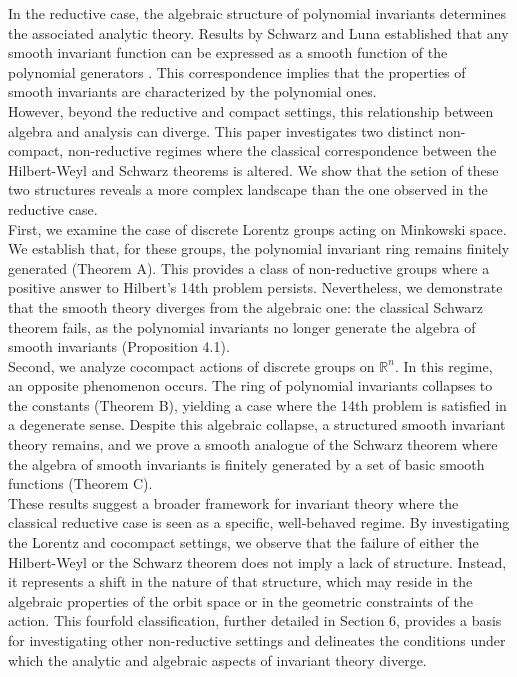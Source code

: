 \documentclass[]{article}
\begin{document}
In the reductive case, the algebraic structure of polynomial invariants determines the associated analytic theory. Results by Schwarz and Luna established that any smooth invariant function can be expressed as a smooth function of the polynomial generators \cite{luna1976, schwarz1975}. This correspondence implies that the properties of smooth invariants are characterized by the polynomial ones.\\

However, beyond the reductive and compact settings, this relationship between algebra and analysis can diverge. This paper investigates two distinct non-compact, non-reductive regimes where the classical correspondence between the Hilbert-Weyl and Schwarz theorems is altered. We show that the setion of these two structures reveals a more complex landscape than the one observed in the reductive case.\\

First, we examine the case of discrete Lorentz groups acting on Minkowski space. We establish that, for these groups, the polynomial invariant ring remains finitely generated (Theorem A). This provides a class of non-reductive groups where a positive answer to Hilbert's 14th problem persists. Nevertheless, we demonstrate that the smooth theory diverges from the algebraic one: the classical Schwarz theorem fails, as the polynomial invariants no longer generate the algebra of smooth invariants (Proposition 4.1).\\

Second, we analyze cocompact actions of discrete groups on $\mathbb{R}^n$. In this regime, an opposite phenomenon occurs. The ring of polynomial invariants collapses to the constants (Theorem B), yielding a case where the 14th problem is satisfied in a degenerate sense. Despite this algebraic collapse, a structured smooth invariant theory remains, and we prove a smooth analogue of the Schwarz theorem where the algebra of smooth invariants is finitely generated by a set of basic smooth functions (Theorem C).\\

These results suggest a broader framework for invariant theory where the classical reductive case is seen as a specific, well-behaved regime. By investigating the Lorentz and cocompact settings, we observe that the failure of either the Hilbert-Weyl or the Schwarz theorem does not imply a lack of structure. Instead, it represents a shift in the nature of that structure, which may reside in the algebraic properties of the orbit space or in the geometric constraints of the action. This fourfold classification, further detailed in Section 6, provides a basis for investigating other non-reductive settings and delineates the conditions under which the analytic and algebraic aspects of invariant theory diverge.\\
\end{document}
